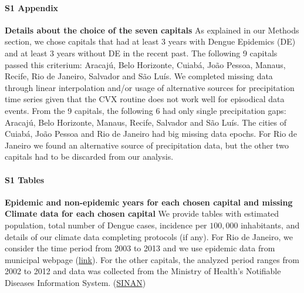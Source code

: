 \documentclass[final,leqno]{siamltexmm2}
\begin{document}
\paragraph*{S1 Appendix}
\label{S1_Appendix}\textbf{Details about the choice of the seven capitals}
As explained in our Methods section, we chose capitals that had at least 3 years with Dengue Epidemics (DE) and at least 3 years without DE in the recent past. 
The following 9 capitals passed this criterium: Aracaj\'u, Belo Horizonte, Cuiab\'a, Jo\~ao Pessoa, Manaus, Recife, Rio de Janeiro, Salvador and S\~ao Lu\'is. We completed missing data through linear interpolation and/or usage of alternative sources for precipitation time series given that the CVX routine does not work well for episodical data events. From the 9 capitals, the following 6 had only single precipitation gaps: Aracaj\'u, Belo Horizonte, Manaus, Recife, Salvador and S\~ao Lu\'is. The cities of Cuiab\'a, Jo\~ao Pessoa and Rio de Janeiro had big missing data epochs. For Rio de Janeiro we found an alternative source of precipitation data, but the other two capitals had to be discarded from our analysis. 
\vspace{1em}

\paragraph*{S1 Tables}
\label{S1_Tables}
{\bf Epidemic and non-epidemic years for each chosen capital and missing Climate data for each chosen capital}
We provide tables with estimated population, total number of Dengue cases, incidence per $100,000$ inhabitants, and details of our 
climate data completing protocols (if any). For Rio de Janeiro, we consider the time period from 2003 to 2013 and we use epidemic data from municipal 
webpage (\href{http://www.rio.rj.gov.br/web/sms/dengue}{link}). For the other capitals, the analyzed period ranges from 2002 to 2012 and data 
was collected from the Ministry of Health's  Notifiable Diseases Information System. (\href{http://www.portalsinan.saude.gov.br}{SINAN})
\end{document}
